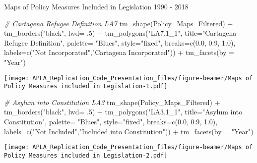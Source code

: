 \documentclass[
  ignorenonframetext,
]{beamer}
\newenvironment{Shaded}{\begin{snugshade}}{\end{snugshade}}
\newcommand{\AttributeTok}[1]{\textcolor[rgb]{0.77,0.63,0.00}{#1}}
\newcommand{\CommentTok}[1]{\textcolor[rgb]{0.56,0.35,0.01}{\textit{#1}}}
\newcommand{\DecValTok}[1]{\textcolor[rgb]{0.00,0.00,0.81}{#1}}
\newcommand{\FloatTok}[1]{\textcolor[rgb]{0.00,0.00,0.81}{#1}}
\newcommand{\FunctionTok}[1]{\textcolor[rgb]{0.00,0.00,0.00}{#1}}
\newcommand{\NormalTok}[1]{#1}
\newcommand{\SpecialCharTok}[1]{\textcolor[rgb]{0.00,0.00,0.00}{#1}}
\newcommand{\StringTok}[1]{\textcolor[rgb]{0.31,0.60,0.02}{#1}}
\begin{document}
\begin{frame}[fragile]{Maps of Policy Measures Included in Legislation
1990 - 2018}
\begin{Shaded}
\begin{Highlighting}[]
\CommentTok{\# Cartagena Refugee Definition LA7}
\FunctionTok{tm\_shape}\NormalTok{(Policy\_Maps\_Filtered) }\SpecialCharTok{+} \FunctionTok{tm\_borders}\NormalTok{(}\StringTok{"black"}\NormalTok{, }\AttributeTok{lwd=}\NormalTok{ .}\DecValTok{5}\NormalTok{) }\SpecialCharTok{+} \FunctionTok{tm\_polygons}\NormalTok{(}\StringTok{"LA7.1\_1"}\NormalTok{, }\AttributeTok{title=}\StringTok{"Cartagena Refugee Definition"}\NormalTok{, }\AttributeTok{palette=} \StringTok{"Blues"}\NormalTok{, }\AttributeTok{style=}\StringTok{"fixed"}\NormalTok{, }\AttributeTok{breaks=}\FunctionTok{c}\NormalTok{(}\FloatTok{0.0}\NormalTok{, }\FloatTok{0.9}\NormalTok{, }\FloatTok{1.0}\NormalTok{), }\AttributeTok{labels=}\FunctionTok{c}\NormalTok{(}\StringTok{"Not Incorporated"}\NormalTok{,}\StringTok{"Cartagena Incorporated"}\NormalTok{)) }\SpecialCharTok{+} \FunctionTok{tm\_facets}\NormalTok{(}\AttributeTok{by =} \StringTok{"Year"}\NormalTok{)}
\end{Highlighting}
\end{Shaded}

\texttt{[image: APLA\_Replication\_Code\_Presentation\_files/figure-beamer/Maps of Policy Measures included in Legislation-1.pdf]}

\begin{Shaded}
\begin{Highlighting}[]
\CommentTok{\# Asylum into Constitution  LA3}
\FunctionTok{tm\_shape}\NormalTok{(Policy\_Maps\_Filtered) }\SpecialCharTok{+} \FunctionTok{tm\_borders}\NormalTok{(}\StringTok{"black"}\NormalTok{, }\AttributeTok{lwd=}\NormalTok{ .}\DecValTok{5}\NormalTok{) }\SpecialCharTok{+} \FunctionTok{tm\_polygons}\NormalTok{(}\StringTok{"LA3.1\_1"}\NormalTok{, }\AttributeTok{title=}\StringTok{"Asylum into Constitution"}\NormalTok{, }\AttributeTok{palette=} \StringTok{"Blues"}\NormalTok{, }\AttributeTok{style=}\StringTok{"fixed"}\NormalTok{, }\AttributeTok{breaks=}\FunctionTok{c}\NormalTok{(}\FloatTok{0.0}\NormalTok{, }\FloatTok{0.9}\NormalTok{, }\FloatTok{1.0}\NormalTok{), }\AttributeTok{labels=}\FunctionTok{c}\NormalTok{(}\StringTok{"Not Included"}\NormalTok{,}\StringTok{"Included into Constitution"}\NormalTok{)) }\SpecialCharTok{+} \FunctionTok{tm\_facets}\NormalTok{(}\AttributeTok{by =} \StringTok{"Year"}\NormalTok{)}
\end{Highlighting}
\end{Shaded}

\texttt{[image: APLA\_Replication\_Code\_Presentation\_files/figure-beamer/Maps of Policy Measures included in Legislation-2.pdf]}


\end{frame}
\end{document}

